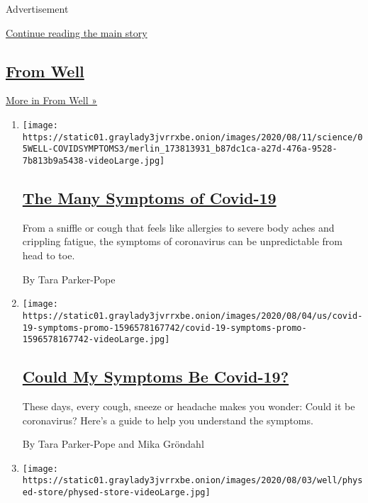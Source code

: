 Advertisement

\protect\hyperlink{after-mid1}{Continue reading the main story}

\hypertarget{from-well}{%
\subsection{\texorpdfstring{\href{/section/well}{From
Well}}{From Well}}\label{from-well}}

\href{/section/well}{More in From Well »}

\begin{enumerate}
\def\labelenumi{\arabic{enumi}.}
\item
  \texttt{[image: https://static01.graylady3jvrrxbe.onion/images/2020/08/11/science/05WELL-COVIDSYMPTOMS3/merlin\_173813931\_b87dc1ca-a27d-476a-9528-7b813b9a5438-videoLarge.jpg]}

  \hypertarget{the-many-symptoms-of-covid-19}{%
  \subsection{\texorpdfstring{\href{/2020/08/05/well/live/coronavirus-covid-symptoms.html}{The
  Many Symptoms of
  Covid-19}}{The Many Symptoms of Covid-19}}\label{the-many-symptoms-of-covid-19}}

  From a sniffle or cough that feels like allergies to severe body aches
  and crippling fatigue, the symptoms of coronavirus can be
  unpredictable from head to toe.

  By Tara Parker-Pope
\item
  \texttt{[image: https://static01.graylady3jvrrxbe.onion/images/2020/08/04/us/covid-19-symptoms-promo-1596578167742/covid-19-symptoms-promo-1596578167742-videoLarge.jpg]}

  \hypertarget{could-my-symptoms-be-covid-19}{%
  \subsection{\texorpdfstring{\href{/interactive/2020/08/05/well/covid-19-symptoms.html}{Could
  My Symptoms Be
  Covid-19?}}{Could My Symptoms Be Covid-19?}}\label{could-my-symptoms-be-covid-19}}

  These days, every cough, sneeze or headache makes you wonder: Could it
  be coronavirus? Here's a guide to help you understand the symptoms.

  By Tara Parker-Pope and Mika Gröndahl
\item
  \texttt{[image: https://static01.graylady3jvrrxbe.onion/images/2020/08/03/well/physed-store/physed-store-videoLarge.jpg]}


\end{enumerate}
